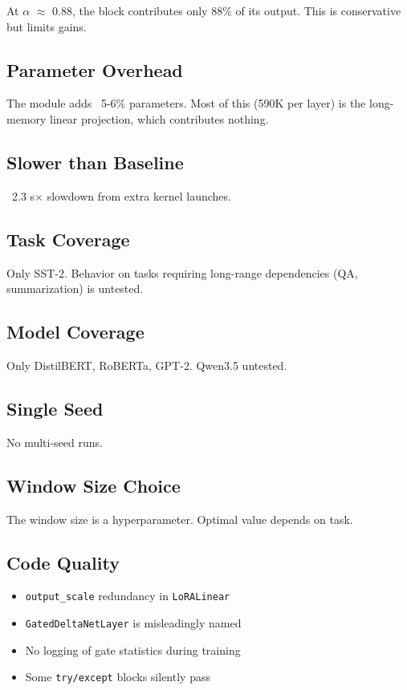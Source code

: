 At $\alpha$ $\approx$ 0.88, the block contributes only 88\% of its output. This is 
conservative but limits gains.

\subsection{Parameter Overhead}

The module adds ~5-6\% parameters. Most of this (590K per layer) is the 
long-memory linear projection, which contributes nothing.

\subsection{Slower than Baseline}

~2.3 s$\times$ slowdown from extra kernel launches.

\subsection{Task Coverage}

Only SST-2. Behavior on tasks requiring long-range dependencies (QA, 
summarization) is untested.

\subsection{Model Coverage}

Only DistilBERT, RoBERTa, GPT-2. Qwen3.5 untested.

\subsection{Single Seed}

No multi-seed runs.

\subsection{Window Size Choice}

The window size is a hyperparameter. Optimal value depends on task.

\subsection{Code Quality}

\begin{itemize}
\item \texttt{output\_scale} redundancy in \texttt{LoRALinear}
\item \texttt{GatedDeltaNetLayer} is misleadingly named
\item No logging of gate statistics during training
\item Some \texttt{try/except} blocks silently pass

\end{itemize}
